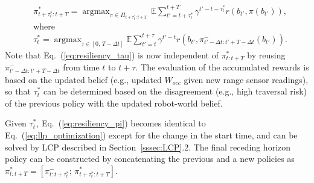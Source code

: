 \documentclass[letterpaper]{article} %
\newcommand{\argmax}{\mathop{\mathrm{argmax}}}
\begin{document}
%
%
%
\begin{align}
  & \pi_{t+\tau^*_t:t+T}^* = \argmax_{\pi \in \Pi_{t+\tau^*_t:t+T}} \, \mathbb{E} \sum_{t'=t+\tau^*_t}^{t+T} \gamma^{t'-t-\tau^*_t} r(b_{t'}, \pi(b_{t'})),
  \label{eq:resiliency_pi}
  \\
  &\text{where}
  \nonumber \\
  & \tau^*_t = \argmax_{\tau \in [0,\, T-\Delta t]} \mathbb{E} \sum_{t'=t}^{t+\tau} \gamma^{t'-t} r(b_{t'}, \pi_{{t'}-\Delta t:{t'}+T-\Delta t}^-(b_{t'})).
  \label{eq:resiliency_tau}
\end{align}
\normalsize
%
Note that Eq.~(\ref{eq:resiliency_tau}) is now independent of $\pi_{t:t+T}^*$ by reusing $\pi_{{t'}-\Delta t:{t'}+T-\Delta t}^-$ from time $t$ to $t + \tau$.
The evaluation of the accumulated rewards is based on the updated belief (e.g., updated $W_{occ}$ given new range sensor readings), so that $\tau^*_t$ can be determined based on the disagreement (e.g., high traversal risk) of the previous policy with the updated robot-world belief.

Given $\tau^*_t$, Eq.~(\ref{eq:resiliency_pi}) becomes identical to Eq.~(\ref{eq:llp_optimization}) except for the change in the start time,
and can be solved by LCP described in Section~\ref{sssec:LCP}.2.  %
%
The final receding horizon policy can be constructed by concatenating the previous and a new policies as $\pi_{t:t+T}^* = [\pi_{t:t+\tau^*_t}^-; \, \pi_{t+\tau^*_t:t+T}^*]$.




\end{document}
